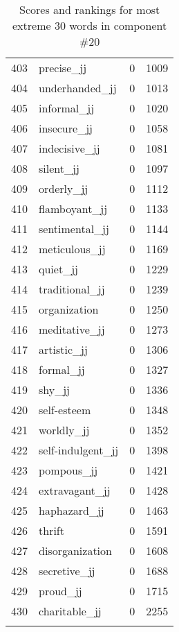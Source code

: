 \begin{longtable}[!htbp]{| rlr@{.}l |}
    403 & precise\_jj & 0 & 1009 \\
    404 & underhanded\_jj & 0 & 1013 \\
    405 & informal\_jj & 0 & 1020 \\
    406 & insecure\_jj & 0 & 1058 \\
    407 & indecisive\_jj & 0 & 1081 \\
    408 & silent\_jj & 0 & 1097 \\
    409 & orderly\_jj & 0 & 1112 \\
    410 & flamboyant\_jj & 0 & 1133 \\
    411 & sentimental\_jj & 0 & 1144 \\
    412 & meticulous\_jj & 0 & 1169 \\
    413 & quiet\_jj & 0 & 1229 \\
    414 & traditional\_jj & 0 & 1239 \\
    415 & organization & 0 & 1250 \\
    416 & meditative\_jj & 0 & 1273 \\
    417 & artistic\_jj & 0 & 1306 \\
    418 & formal\_jj & 0 & 1327 \\
    419 & shy\_jj & 0 & 1336 \\
    420 & self-esteem & 0 & 1348 \\
    421 & worldly\_jj & 0 & 1352 \\
    422 & self-indulgent\_jj & 0 & 1398 \\
    423 & pompous\_jj & 0 & 1421 \\
    424 & extravagant\_jj & 0 & 1428 \\
    425 & haphazard\_jj & 0 & 1463 \\
    426 & thrift & 0 & 1591 \\
    427 & disorganization & 0 & 1608 \\
    428 & secretive\_jj & 0 & 1688 \\
    429 & proud\_jj & 0 & 1715 \\
    430 & charitable\_jj & 0 & 2255 \\
    \hline
    \caption{Scores and rankings for most extreme 30 words in component \#20} \\
\end{longtable}

